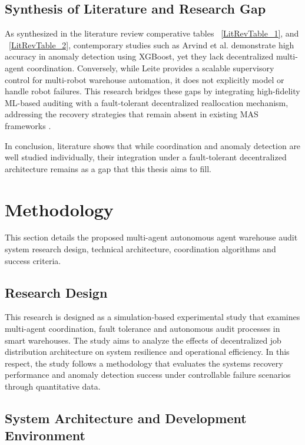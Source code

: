 \documentclass[conference]{IEEEtran}
\begin{document}
\subsection{Synthesis of Literature and Research Gap}

As synthesized in the literature review comperative tables ~\ref{LitRevTable_1}, and ~\ref{LitRevTable_2}, contemporary studies such as Arvind et al. \cite{arvind2025intelligent} demonstrate high accuracy in anomaly detection using XGBoost, yet they lack decentralized multi-agent coordination. Conversely, while Leite \cite{leite2024coordination} provides a scalable supervisory control for multi-robot warehouse automation, it does not explicitly model or handle robot failures. This research bridges these gaps by integrating high-fidelity ML-based auditing with a fault-tolerant decentralized reallocation mechanism, addressing the recovery strategies that remain absent in existing MAS frameworks \cite{hayes2026decentralized} \cite{govoni2024decentralized}.


In conclusion, literature shows that while coordination and anomaly detection are well studied individually, their integration under a fault-tolerant decentralized architecture remains as a gap that this thesis aims to fill.

\section{Methodology}

This section details the proposed multi-agent autonomous agent warehouse audit system research design, technical architecture, coordination algorithms and success criteria.

\subsection{Research Design}

This research is designed as a simulation-based experimental study that examines multi-agent coordination, fault tolerance and autonomous audit processes in smart warehouses. The study aims to analyze the effects of decentralized job distribution architecture on system resilience and operational efficiency. In this respect, the study follows a methodology that evaluates the systems recovery performance and anomaly detection success under controllable failure scenarios through quantitative data.

\subsection{System Architecture and Development Environment}
\end{document}
